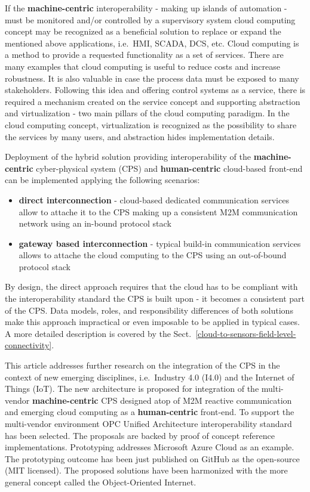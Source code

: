 \documentclass{jacsart}
\begin{document}
If the \textbf{machine-centric} interoperability - making up islands of automation - must be monitored and/or controlled by a supervisory system cloud computing concept may be recognized as a beneficial solution to replace or expand the mentioned above applications, i.e.~HMI, SCADA, DCS, etc. Cloud computing is a method to provide a requested functionality as a set of services. There are many examples that cloud computing is useful to reduce costs and increase robustness. It is also valuable in case the process data must be exposed to many stakeholders. Following this idea and offering control systems as a service, there is required a mechanism created on the service concept and supporting abstraction and virtualization - two main pillars of the cloud computing paradigm. In the cloud computing concept, virtualization is recognized as the possibility to share the services by many users, and abstraction hides implementation details.

Deployment of the hybrid solution providing interoperability of the \textbf{machine-centric} cyber-physical system (CPS) and \textbf{human-centric} cloud-based front-end can be implemented applying the following scenarios:

\begin{itemize}
      \item \textbf{direct interconnection} - cloud-based dedicated communication services allow to attache it to the CPS making up a consistent M2M communication network using an in-bound protocol stack
      \item \textbf{gateway based interconnection} - typical build-in communication services allows to attache the cloud computing to the CPS using an out-of-bound protocol stack
\end{itemize}

By design, the direct approach requires that the cloud has to be compliant with the interoperability standard the CPS is built upon - it becomes a consistent part of the CPS. Data models, roles, and responsibility differences of both solutions make this approach impractical or even imposable to be applied in typical cases. A more detailed description is covered by the Sect.~\ref*{cloud-to-sensors-field-level-connectivity}.

This article addresses further research on the integration of the CPS in the context of new emerging disciplines, i.e.~Industry 4.0 (I4.0) and the Internet of Things (IoT). The new architecture is proposed for integration of the multi-vendor \textbf{machine-centric} CPS designed atop of M2M reactive communication and emerging cloud computing as a \textbf{human-centric} front-end. To support the multi-vendor environment OPC Unified Architecture interoperability standard has been selected. The proposals are backed by proof of concept reference implementations. Prototyping addresses Microsoft Azure Cloud as an example. The prototyping outcome has been just published on GitHub as the open-source (MIT licensed). The proposed solutions have been harmonized with the more general concept called the Object-Oriented Internet.
\end{document}
